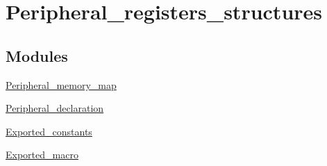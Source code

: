 \hypertarget{group___peripheral__registers__structures}{\section{Peripheral\-\_\-registers\-\_\-structures}
\label{group___peripheral__registers__structures}
}
\subsection*{Modules}
\begin{DoxyCompactItemize}
\item 
\hyperlink{group___peripheral__memory__map}{Peripheral\-\_\-memory\-\_\-map}
\item 
\hyperlink{group___peripheral__declaration}{Peripheral\-\_\-declaration}
\item 
\hyperlink{group___exported__constants}{Exported\-\_\-constants}
\item 
\hyperlink{group___exported__macro}{Exported\-\_\-macro}
\end{DoxyCompactItemize}
